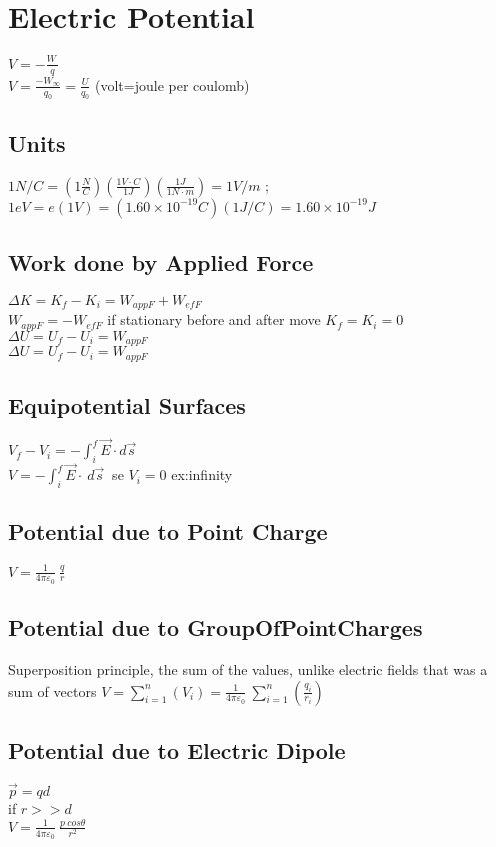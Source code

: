 \section{Electric Potential}
$V=-\frac{W_{\:}}{q}$\\
$V=\frac{-W_{\infty }}{q_0}=\frac{U}{q_0}$ (volt=joule per coulomb)\\
\subsection{Units}
$1N/C=\left(1\frac{N}{C}\right)\left(\frac{1V\cdot C}{1J}\right)\left(\frac{1J}{1N\cdot m}\right)=1V/m$ ;
$1eV=e\left(1 V\right)=\left(1.60\times 10^{-19} C\right)\left(1 J/C\right)=1.60\times 10^{-19}J$\\
\subsection{Work done by Applied Force}
$\Delta K=K_f-K_i=W_{appF}+W_{efF}$\\
$W_{appF}=-W_{efF}$ if stationary before and after move $K_f=K_i=0$\\
$\Delta U=U_f-U_i=W_{appF}$\\
$\Delta U=U_f-U_i=W_{appF}$\\
\subsection{Equipotential Surfaces}
$V_f-V_i=-\int _i^f\vec{E}\cdot d\vec{s}\:$\\
$V=-\int _i^f\vec{E}\cdot \:d\vec{s}\:$ se $V_i = 0$ ex:infinity\\
\subsection{Potential due to Point Charge}
$V=\frac{1}{4\pi \varepsilon _0}\:\frac{q}{r}$\\
\subsection{Potential due to GroupOfPointCharges}
Superposition principle, the sum of the values, unlike electric fields that was a sum of vectors
$V=\sum _{i=1}^n\left(V_i\right)=\frac{1}{4\pi \varepsilon _0}\:\sum _{i=1}^n\left(\frac{q_i}{r_i}\right)$\\
\subsection{Potential due to Electric Dipole}
$\vec{p}=qd$\\
if $r>>d$\\
$V=\frac{1}{4\pi \varepsilon _0}\:\frac{p\:cos\theta }{r^2}$\\
